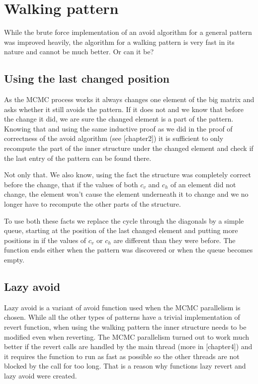 \section{Walking pattern}
While the brute force implementation of an avoid algorithm for a general pattern was improved heavily, the algorithm for a walking pattern is very fast in its nature and cannot be much better. Or can it be?

\subsection{Using the last changed position}
As the MCMC process works it always changes one element of the big matrix and asks whether it still avoids the pattern. If it does not and we know that before the change it did, we are sure the changed element is a part of the pattern. Knowing that and using the same inductive proof as we did in the proof of correctness of the avoid algorithm (see [chapter2]) it is sufficient to only recompute the part of the inner structure under the changed element and check if the last entry of the pattern can be found there.

Not only that. We also know, using the fact the structure was completely correct before the change, that if the values of both $c_v$ and $c_h$ of an element did not change, the element won't cause the element underneath it to change and we no longer have to recompute the other parts of the structure.

To use both these facts we replace the cycle through the diagonals by a simple queue, starting at the position of the last changed element and putting more positions in if the values of $c_v$ or $c_h$ are different than they were before. The function ends either when the pattern was discovered or when the queue becomes empty.

\subsection{Lazy avoid}
Lazy avoid is a variant of avoid function used when the MCMC parallelism is chosen. While all the other types of patterns have a trivial implementation of revert function, when using the walking pattern the inner structure needs to be modified even when reverting. The MCMC parallelism turned out to work much better if the revert calls are handled by the main thread (more in [chapter4]) and it requires the function to run as fast as possible so the other threads are not blocked by the call for too long. That is a reason why functions lazy revert and lazy avoid were created.

